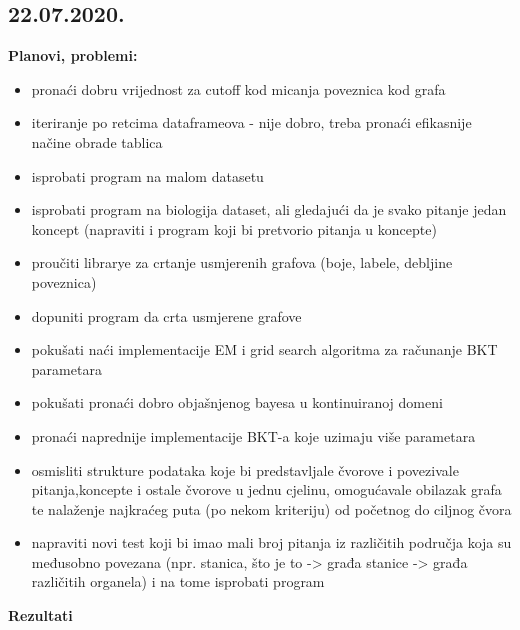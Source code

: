 \documentclass[times, utf8,projekt]{fer}
\begin{document}
		\subsection{22.07.2020.}
		\textbf{Planovi, problemi:}
		\begin{itemize}
			\item pronaći dobru vrijednost za cutoff kod micanja poveznica kod grafa
			\item iteriranje po retcima dataframeova - nije dobro, treba pronaći efikasnije načine obrade tablica
			\item isprobati program na malom datasetu
			\item isprobati program na biologija dataset, ali gledajući da je svako pitanje jedan koncept (napraviti i program koji bi pretvorio pitanja u koncepte)
			\item proučiti librarye za crtanje usmjerenih grafova (boje, labele, debljine poveznica)
			\item dopuniti program da crta usmjerene grafove
			\item pokušati naći implementacije EM i grid search algoritma za računanje BKT parametara
			\item pokušati pronaći dobro objašnjenog bayesa u kontinuiranoj domeni
			\item pronaći naprednije implementacije BKT-a koje uzimaju više parametara
			\item osmisliti strukture podataka koje bi predstavljale čvorove i povezivale pitanja,koncepte i ostale čvorove u jednu cjelinu, omogućavale obilazak grafa te nalaženje najkraćeg puta (po nekom kriteriju) od početnog do ciljnog čvora
			\item napraviti novi test koji bi imao mali broj pitanja iz različitih područja koja su međusobno povezana (npr. stanica, što je to -> građa stanice -> građa različitih organela) i na tome isprobati program\newline
		\end{itemize}
		\textbf{Rezultati}
\end{document}
